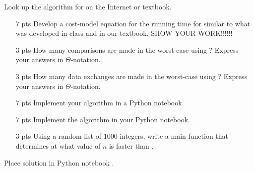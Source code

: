 \documentclass[11pt]{article}
\begin{document}
\begin{questions}
\ifprintanswers
\bigskip
\else
\bigskip
\fi


%
%
\question[30]
Look up the algorithm for  on the Internet or textbook.  
\begin{enumerate}
	\item [7 pts] Develop a cost-model equation for the running time for  similar to what was developed in class and in our textbook.  SHOW YOUR WORK!!!!!!
	\item [3 pts] How many comparisons are made in the worst-case using ?  Express your answers in $\Theta$-notation.
	\item [3 pts] How many data exchanges are made in the worst-case using ?  Express your answers in $\Theta$-notation.
	\item [7 pts] Implement your algorithm in a Python notebook.
	\item [7 pts] Implement the  algorithm in your Python notebook.
	\item [3 pts] Using a random list of 1000 integers, write a main function that determines at what value of $n$  is faster than .
\end{enumerate}
\begin{solutionorbox}
	Place solution in Python notebook .
\end{solutionorbox}


%
\end{questions}
\end{document}
